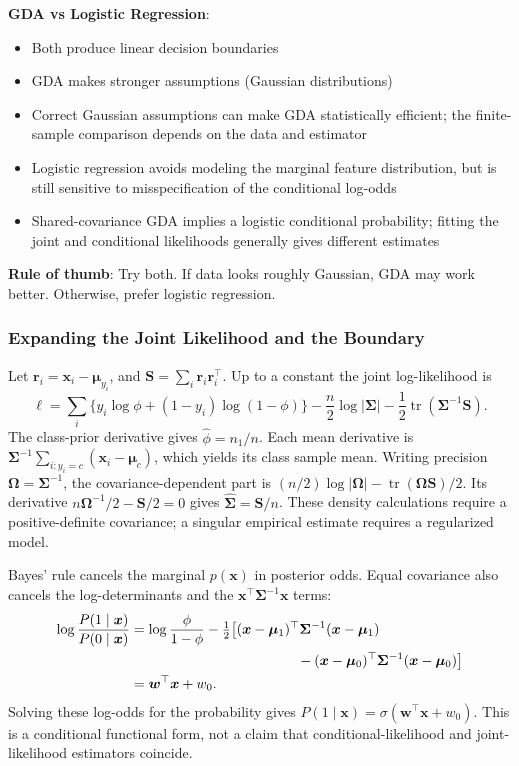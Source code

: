 \documentclass[11pt,twoside]{article}
\numberwithin{equation}{section}
\newcommand{\vect}[1]{\bm{#1}}
\newcommand{\mat}[1]{\bm{#1}}
\theoremstyle{plain}
\theoremstyle{definition}
\theoremstyle{remark}
\newenvironment{keyidea}{
  \begin{tcolorbox}[colback=yellow!5!white,
                    colframe=yellow!50!black,
                    title=Key Idea,
                    breakable,
                    enhanced,
                    sharp corners,
                    boxrule=0.8pt,
                    left=6pt, right=6pt, top=6pt, bottom=6pt]
}{
  \end{tcolorbox}
}
\begin{document}
\begin{keyidea}
\textbf{GDA vs Logistic Regression}:
\begin{itemize}
\item Both produce linear decision boundaries
\item GDA makes stronger assumptions (Gaussian distributions)
\item Correct Gaussian assumptions can make GDA statistically efficient; the finite-sample comparison depends on the data and estimator
\item Logistic regression avoids modeling the marginal feature distribution, but is still sensitive to misspecification of the conditional log-odds
\item Shared-covariance GDA implies a logistic conditional probability; fitting the joint and conditional likelihoods generally gives different estimates
\end{itemize}

\textbf{Rule of thumb}: Try both. If data looks roughly Gaussian, GDA may work better. Otherwise, prefer logistic regression.
\end{keyidea}

\subsubsection{Expanding the Joint Likelihood and the Boundary}
Let $\vect r_i=\vect x_i-\vect\mu_{y_i}$, and $\mat S=\sum_i\vect r_i\vect r_i^\top$. Up to a constant the joint log-likelihood is
\[
\ell=\sum_i\{y_i\log\phi+(1-y_i)\log(1-\phi)\}
-\frac n2\log|\mat\Sigma|-\frac12\operatorname{tr}(\mat\Sigma^{-1}\mat S).
\]
The class-prior derivative gives $\hat\phi=n_1/n$. Each mean derivative is $\mat\Sigma^{-1}\sum_{i:y_i=c}(\vect x_i-\vect\mu_c)$, which yields its class sample mean. Writing precision $\mat\Omega=\mat\Sigma^{-1}$, the covariance-dependent part is $(n/2)\log|\mat\Omega|-\operatorname{tr}(\mat\Omega\mat S)/2$. Its derivative $n\mat\Omega^{-1}/2-\mat S/2=0$ gives $\hat{\mat\Sigma}=\mat S/n$. These density calculations require a positive-definite covariance; a singular empirical estimate requires a regularized model.

Bayes' rule cancels the marginal $p(\vect x)$ in posterior odds. Equal covariance also cancels the log-determinants and the $\vect x^\top\mat\Sigma^{-1}\vect x$ terms:
\begin{align*}
\log\frac{P(1\mid\vect x)}{P(0\mid\vect x)}
&=\log\frac\phi{1-\phi}-\tfrac12\bigl[(\vect x-\vect\mu_1)^\top\mat\Sigma^{-1}(\vect x-\vect\mu_1)\\
&\hspace{42mm}-(\vect x-\vect\mu_0)^\top\mat\Sigma^{-1}(\vect x-\vect\mu_0)\bigr]\\
&=\vect w^\top\vect x+w_0.
\end{align*}
Solving these log-odds for the probability gives $P(1\mid\vect x)=\sigma(\vect w^\top\vect x+w_0)$. This is a conditional functional form, not a claim that conditional-likelihood and joint-likelihood estimators coincide.
\end{document}
